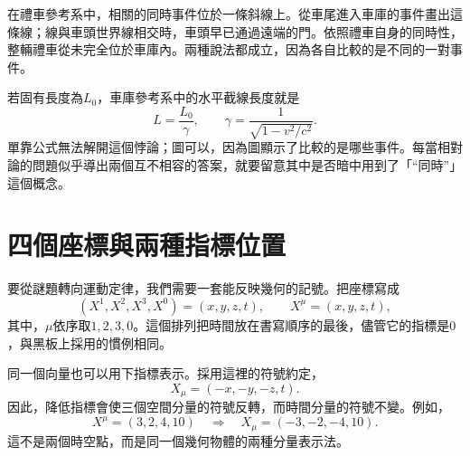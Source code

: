 在禮車參考系中，相關的同時事件位於一條斜線上。從車尾進入車庫的事件畫出這條線；線與車頭世界線相交時，車頭早已通過遠端的門。依照禮車自身的同時性，整輛禮車從未完全位於車庫內。兩種說法都成立，因為各自比較的是不同的一對事件。

\begin{classroomqa}
\end{classroomqa}

若固有長度為\(L_0\)，車庫參考系中的水平截線長度就是\begin{equation}
L=\frac{L_0}{\gamma},
\qquad
\gamma=\frac{1}{\sqrt{1-v^2/c^2}}.
\end{equation}
單靠公式無法解開這個悖論；圖可以，因為圖顯示了比較的是哪些事件。每當相對論的問題似乎導出兩個互不相容的答案，就要留意其中是否暗中用到了「``同時''」這個概念。

\section{四個座標與兩種指標位置}

要從謎題轉向運動定律，我們需要一套能反映幾何的記號。把座標寫成
\begin{equation}
(X^1,X^2,X^3,X^0)=(x,y,z,t),
\qquad X^\mu=(x,y,z,t),
\end{equation}
其中，\(\mu\)依序取\(1,2,3,0\)。這個排列把時間放在書寫順序的最後，儘管它的指標是\(0\)，與黑板上採用的慣例相同。

\begin{classroomqa}
\end{classroomqa}

同一個向量也可以用下指標表示。採用這裡的符號約定，
\begin{equation}
X_\mu=(-x,-y,-z,t).
\end{equation}
因此，降低指標會使三個空間分量的符號反轉，而時間分量的符號不變。例如，
\begin{equation}
X^\mu=(3,2,4,10)
\quad\Longrightarrow\quad
X_\mu=(-3,-2,-4,10).
\end{equation}
這不是兩個時空點，而是同一個幾何物體的兩種分量表示法。

